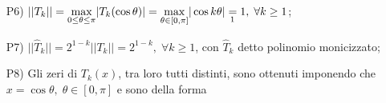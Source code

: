 \begin{property}
\begin{itemize}
		 \begin{equation*}
		 	T_k(x)=T_k(\cos\theta)=\cos{(k\theta)},\quad\forall k\geq 0.
		 \end{equation*} \footnote{Polinomio di Chebyschev, se $x$ è parametrizzata in modo idoneo.}
		\begin{proof}
			È svolta per induzione su $k$. La tesi è vera per $k=0$ e $k=1$.\\
			Vogliamo dimostrare che
			\begin{equation*}
				T_{k+1}(x) = T_{k+1}(\cos(\theta)) = \cos((k+1)\theta).
			\end{equation*}
			\begin{equation*}
				\begin{matrix}
					k=0&\Rightarrow& T_0(x) &=& T_0(\cos\theta) &=& \cos{(0\cdot\theta)} &\equiv& 1,\\
					k=1 &\Rightarrow& T_1(x) &=& T_1(\cos\theta) &=& \cos\theta &=& x,
				\end{matrix}
			\end{equation*}
			supposto vero per $k$ e $k-1$ è dimostrato per $k+1$ ciò che segue:
			\begin{equation*}
				\begin{matrix}
					\boldsymbol{T_{k+1}(x)}&\boldsymbol =& 2x\,T_k(x)-T_{k-1}(x) &=& 2cos\theta\cdot\cos{(k\theta)}-\cos{((k-1)\theta)}\\
					&=&2cos\theta\cdot\cos{(k\theta)}-\cos\theta\cdot\cos{(k\theta)}-\sin\theta\sin{(k\theta)} &=& \cos\theta\cdot\cos{(k\theta)}-\sin\theta\cdot\sin{(k\theta)}\\
					&&&=&\boldsymbol{\cos{((k+1)\,\theta)}}
				\end{matrix}
			\end{equation*}
		\end{proof}
		\item[P6)]\footnotemark $||T_k||= \underset{0\leq \theta\leq \pi}{\max}|T_k(\cos\theta)| = \underset{\theta\in [0,\pi]}{\max}|\cos{k\theta}|
		\underset{\footnotemark}{=} 1,\;\forall k\geq 1$;
		\addtocounter{footnote}{-1}
		\item[P7)]$||\widehat T_k||=2^{1-k}||T_k||=2^{1-k},\;\forall k\geq 1$, con $\widehat T_k$ detto polinomio monicizzato;
		\item[P8)] Gli zeri di $T_k(x)$, tra loro tutti distinti, sono ottenuti imponendo che $x=\cos\theta,\;\theta\in [0,\pi]$ e sono della forma
		\begin{equation}\label{eq:zero_polinomio_chebyshev_1specie}

\end{equation}
\end{itemize}
\end{property}
